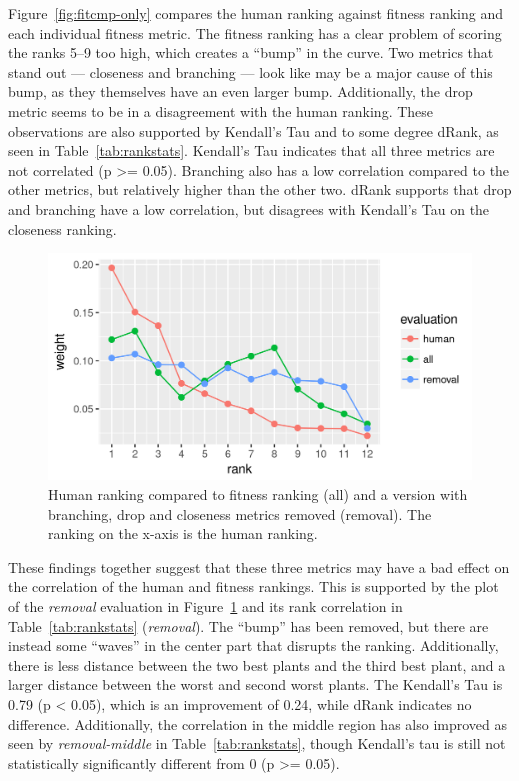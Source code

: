 Figure~\ref{fig:fitcmp-only} compares the human ranking against fitness ranking and each individual fitness metric.
The fitness ranking has a clear problem of scoring the ranks 5--9 too high, which creates a ``bump'' in the curve.
Two metrics that stand out --- closeness and branching --- look like may be a major cause of this bump, as they themselves have an even larger bump.
Additionally, the drop metric seems to be in a disagreement with the human ranking.
These observations are also supported by Kendall's Tau and to some degree dRank, as seen in Table~\ref{tab:rankstats}.
Kendall's Tau indicates that all three metrics are not correlated (p >= 0.05).
Branching also has a low correlation compared to the other metrics, but relatively higher than the other two.
dRank supports that drop and branching have a low correlation, but disagrees with Kendall's Tau on the closeness ranking.

\begin{figure}
    \centering
    \includegraphics[width=1.0\textwidth]{figures/fitcmp-removal}
    \caption[Effect of removing some fitness metrics]{Human ranking compared to fitness ranking (all) and a version with branching, drop and closeness metrics removed (removal). The ranking on the x-axis is the human ranking.}
    \label{fig:fitcmp-removal}
\end{figure}

These findings together suggest that these three metrics may have a bad effect on the correlation of the human and fitness rankings.
This is supported by the plot of the \textit{removal} evaluation in Figure~\ref{fig:fitcmp-removal} and its rank correlation in Table~\ref{tab:rankstats} (\textit{removal}).
The ``bump'' has been removed, but there are instead some ``waves'' in the center part that disrupts the ranking.
Additionally, there is less distance between the two best plants and the third best plant, and a larger distance between the worst and second worst plants.
The Kendall's Tau is 0.79 (p < 0.05), which is an improvement of 0.24, while dRank indicates no difference.
Additionally, the correlation in the middle region has also improved as seen by \textit{removal-middle} in Table~\ref{tab:rankstats}, though Kendall's tau is still not statistically significantly different from 0 (p >= 0.05).

